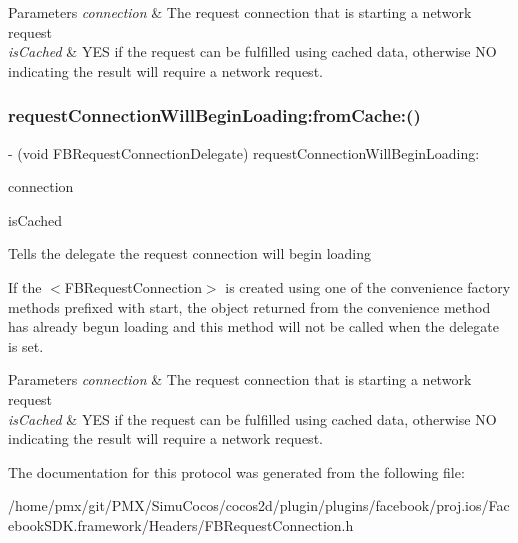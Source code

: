 \begin{DoxyParams}{Parameters}
{\em connection} & The request connection that is starting a network request \\
\hline
{\em is\+Cached} & Y\+ES if the request can be fulfilled using cached data, otherwise NO indicating the result will require a network request. \\
\hline
\end{DoxyParams}
\mbox{\label{protocolFBRequestConnectionDelegate_01-p_a8e31e2b5023edb3b869c0cd0be288a29}} 
\subsubsection{\texorpdfstring{request\+Connection\+Will\+Begin\+Loading\+:from\+Cache\+:()}{requestConnectionWillBeginLoading:fromCache:()}\hspace{0.1cm}{\footnotesize\ttfamily [5/5]}}
{\footnotesize\ttfamily -\/ (void F\+B\+Request\+Connection\+Delegate) request\+Connection\+Will\+Begin\+Loading\+: \begin{DoxyParamCaption}\item[{(\hyperlink{interfaceFBRequestConnection}{F\+B\+Request\+Connection} $\ast$)}]{connection }\item[{fromCache:(B\+O\+OL)}]{is\+Cached }\end{DoxyParamCaption}\hspace{0.3cm}{\ttfamily [optional]}}

Tells the delegate the request connection will begin loading

If the $<$\+F\+B\+Request\+Connection$>$ is created using one of the convenience factory methods prefixed with start, the object returned from the convenience method has already begun loading and this method will not be called when the delegate is set.


\begin{DoxyParams}{Parameters}
{\em connection} & The request connection that is starting a network request \\
\hline
{\em is\+Cached} & Y\+ES if the request can be fulfilled using cached data, otherwise NO indicating the result will require a network request. \\
\hline
\end{DoxyParams}


The documentation for this protocol was generated from the following file\+:\begin{DoxyCompactItemize}
\item 
/home/pmx/git/\+P\+M\+X/\+Simu\+Cocos/cocos2d/plugin/plugins/facebook/proj.\+ios/\+Facebook\+S\+D\+K.\+framework/\+Headers/F\+B\+Request\+Connection.\+h\end{DoxyCompactItemize}
